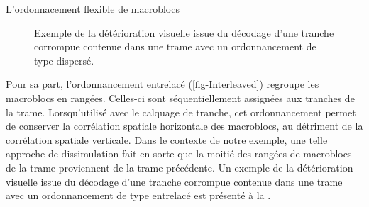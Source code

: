 \begin{section}{L'ordonnacement flexible de macroblocs}
\begin{figure}
	\caption[Détérioration visuelle issue d'un ordonnancement dispersé]{Exemple de
la détérioration visuelle issue du décodage d'une tranche corrompue contenue
dans une trame avec un ordonnancement de type dispersé.}
	\label{fig-ExempleDisperse}
\end{figure}

Pour sa part, l'ordonnancement entrelacé (\ref{fig-Interleaved}) regroupe les
macroblocs en rangées. Celles-ci sont séquentiellement assignées aux tranches de
la trame. Lorsqu'utilisé avec le calquage de tranche, cet ordonnancement permet
de conserver la corrélation spatiale horizontale des macroblocs, au détriment de
la corrélation spatiale verticale. Dans le contexte de notre exemple, une telle
approche de dissimulation fait en sorte que la moitié des rangées de
macroblocs de la trame proviennent de la trame précédente. Un exemple de la
détérioration visuelle issue du décodage d'une tranche corrompue contenue dans
une trame avec un ordonnancement de type entrelacé est présenté à la
.


\end{section}
